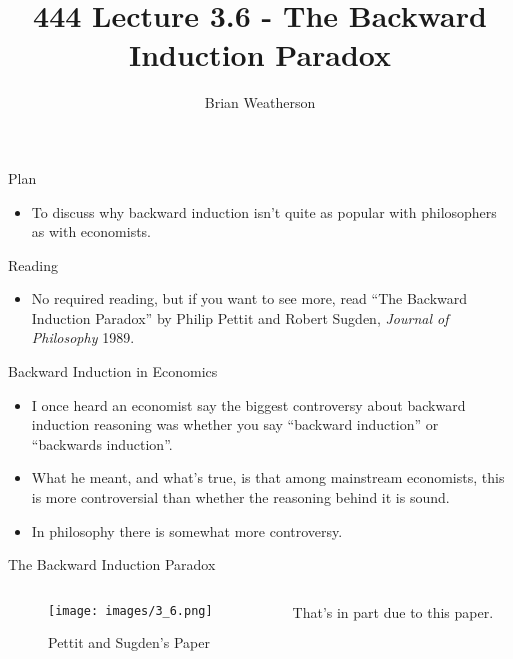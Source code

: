 \documentclass[
  ignorenonframetext,
]{beamer}
\title{444 Lecture 3.6 - The Backward Induction Paradox}
\author{Brian Weatherson}
\date{}
\providecommand{\tightlist}{%
  \setlength{\itemsep}{0pt}\setlength{\parskip}{0pt}}
\begin{document}
\frame{\titlepage}

\begin{frame}{Plan}
\protect\hypertarget{plan}{}
\begin{itemize}
\tightlist
\item
  To discuss why backward induction isn't quite as popular with
  philosophers as with economists.
\end{itemize}
\end{frame}

\begin{frame}{Reading}
\protect\hypertarget{reading}{}
\begin{itemize}
\tightlist
\item
  No required reading, but if you want to see more, read ``The Backward
  Induction Paradox'' by Philip Pettit and Robert Sugden, \emph{Journal
  of Philosophy} 1989.
\end{itemize}
\end{frame}

\begin{frame}{Backward Induction in Economics}
\protect\hypertarget{backward-induction-in-economics}{}
\begin{itemize}
\tightlist
\item
  I once heard an economist say the biggest controversy about backward
  induction reasoning was whether you say ``backward induction'' or
  ``backwards induction''.
\item
  What he meant, and what's true, is that among mainstream economists,
  this is more controversial than whether the reasoning behind it is
  sound.
\item
  In philosophy there is somewhat more controversy.
\end{itemize}
\end{frame}

\begin{frame}{The Backward Induction Paradox}
\protect\hypertarget{the-backward-induction-paradox}{}
\begin{columns}[c]
\begin{column}{0.48\textwidth}
\begin{figure}
\centering
\texttt{[image: images/3\_6.png]}
\caption{Pettit and Sugden's Paper}
\end{figure}
\end{column}

\begin{column}{0.48\textwidth}
That's in part due to this paper.
\end{column}
\end{columns}
\end{frame}
\end{document}
